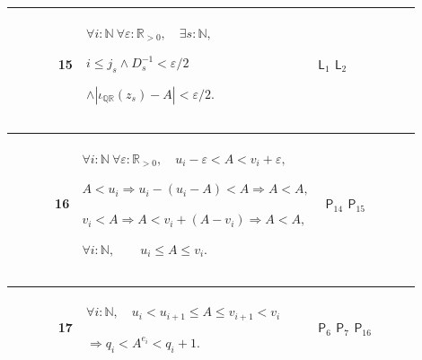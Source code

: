 \documentclass[12pt,reqno]{amsart}
\theoremstyle{blueplain}
\numberwithin{equation}{section}
\begin{document}
{\scriptsize \setlength{\parskip}{0pt}\nointerlineskip
\noindent 
\begin{tabular}{|@{}>{\centering\arraybackslash}m{0.10658\linewidth}|>{\centering\arraybackslash}m{0.03553\linewidth}|>{\centering\arraybackslash}m{0.52105\linewidth}|>{\centering\arraybackslash}m{0.23684\linewidth}|}
\hline
{\hypertarget{row:P15}{$\mathsf{P}$}} & {15} & {$\displaystyle \forall i:%
\mathbb{N}\ \forall\varepsilon:\mathbb{R}_{>0},\quad\exists s:\mathbb{N},$ %
\par$\displaystyle i\le j_s\wedge D_s^{-1}<\varepsilon/2$ \par$\displaystyle %
\wedge|\iota_{\mathbb{Q}\mathbb{R}}(z_s)-A|<\varepsilon/2.$} & {\hyperlink{row:L1}%
{$\mathsf{L}_{1}$} \hyperlink{row:L2}{$\mathsf{L}_{2}$}} \\ \hline
\end{tabular}%
}

{\scriptsize \setlength{\parskip}{0pt}\nointerlineskip
\noindent 
\begin{tabular}{|@{}>{\centering\arraybackslash}m{0.10658\linewidth}|>{\centering\arraybackslash}m{0.03553\linewidth}|>{\centering\arraybackslash}m{0.52105\linewidth}|>{\centering\arraybackslash}m{0.23684\linewidth}|}
\hline
{\hypertarget{row:P16}{$\mathsf{P}$}} & {16} & {$\displaystyle \forall i:%
\mathbb{N}\ \forall\varepsilon:\mathbb{R}_{>0},\quad
u_i-\varepsilon<A<v_i+\varepsilon,$ \par$\displaystyle A<u_i\Rightarrow
u_i-(u_i-A)<A\Rightarrow A<A,$ \par$\displaystyle v_i<A\Rightarrow
A<v_i+(A-v_i)\Rightarrow A<A,$ \par$\displaystyle \forall i:\mathbb{N}%
,\qquad u_i\le A\le v_i.$} & {\hyperlink{row:P14}{$\mathsf{P}_{14}$} 
\hyperlink{row:P15}{$\mathsf{P}_{15}$}} \\ \hline
\end{tabular}%
}

{\scriptsize \setlength{\parskip}{0pt}\nointerlineskip
\noindent 
\begin{tabular}{|@{}>{\centering\arraybackslash}m{0.10658\linewidth}|>{\centering\arraybackslash}m{0.03553\linewidth}|>{\centering\arraybackslash}m{0.52105\linewidth}|>{\centering\arraybackslash}m{0.23684\linewidth}|}
\hline
{\hypertarget{row:P17}{$\mathsf{P}$}} & {17} & {$\displaystyle \forall i:%
\mathbb{N},\quad u_i<u_{i+1}\le A\le v_{i+1}<v_i$ \par$\displaystyle %
\Rightarrow q_i<A^{e_i}<q_i+1.$} & {\hyperlink{row:P6}{$\mathsf{P}_{6}$} 
\hyperlink{row:P7}{$\mathsf{P}_{7}$} \hyperlink{row:P16}{$\mathsf{P}_{16}$}}
\\ \hline
\end{tabular}%
}
\end{document}
